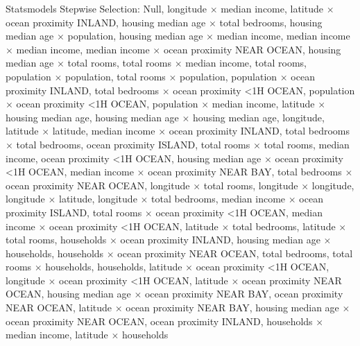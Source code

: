\documentclass{article}
\begin{document}
Statsmodels Stepwise Selection: Null, longitude $\times$ median income, latitude $\times$ ocean proximity INLAND, housing median age $\times$ total bedrooms, housing median age $\times$ population, housing median age $\times$ median income, median income $\times$ median income, median income $\times$ ocean proximity NEAR OCEAN, housing median age $\times$ total rooms, total rooms $\times$ median income, total rooms, population $\times$ population, total rooms $\times$ population, population $\times$ ocean proximity INLAND, total bedrooms $\times$ ocean proximity <1H OCEAN, population $\times$ ocean proximity <1H OCEAN, population $\times$ median income, latitude $\times$ housing median age, housing median age $\times$ housing median age, longitude, latitude $\times$ latitude, median income $\times$ ocean proximity INLAND, total bedrooms $\times$ total bedrooms, ocean proximity ISLAND, total rooms $\times$ total rooms, median income, ocean proximity <1H OCEAN, housing median age $\times$ ocean proximity <1H OCEAN, median income $\times$ ocean proximity NEAR BAY, total bedrooms $\times$ ocean proximity NEAR OCEAN, longitude $\times$ total rooms, longitude $\times$ longitude, longitude $\times$ latitude, longitude $\times$ total bedrooms, median income $\times$ ocean proximity ISLAND, total rooms $\times$ ocean proximity <1H OCEAN, median income $\times$ ocean proximity <1H OCEAN, latitude $\times$ total bedrooms, latitude $\times$ total rooms, households $\times$ ocean proximity INLAND, housing median age $\times$ households, households $\times$ ocean proximity NEAR OCEAN, total bedrooms, total rooms $\times$ households, households, latitude $\times$ ocean proximity <1H OCEAN, longitude $\times$ ocean proximity <1H OCEAN, latitude $\times$ ocean proximity NEAR OCEAN, housing median age $\times$ ocean proximity NEAR BAY, ocean proximity NEAR OCEAN, latitude $\times$ ocean proximity NEAR BAY, housing median age $\times$ ocean proximity NEAR OCEAN, ocean proximity INLAND, households $\times$ median income, latitude $\times$ households
\end{document}
